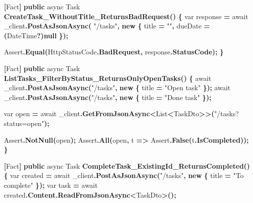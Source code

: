 \documentclass[
  italian,
  10pt,
]{book}
\newenvironment{Shaded}{\begin{snugshade}}{\end{snugshade}}
\newcommand{\DataTypeTok}[1]{\textcolor[rgb]{0.13,0.29,0.53}{#1}}
\newcommand{\FunctionTok}[1]{\textcolor[rgb]{0.13,0.29,0.53}{\textbf{#1}}}
\newcommand{\KeywordTok}[1]{\textcolor[rgb]{0.13,0.29,0.53}{\textbf{#1}}}
\newcommand{\NormalTok}[1]{#1}
\newcommand{\OperatorTok}[1]{\textcolor[rgb]{0.81,0.36,0.00}{\textbf{#1}}}
\newcommand{\StringTok}[1]{\textcolor[rgb]{0.31,0.60,0.02}{#1}}
\begin{document}
\begin{Shaded}
\begin{Highlighting}[]
    \OperatorTok{[}\NormalTok{Fact}\OperatorTok{]}
    \KeywordTok{public}\NormalTok{ async Task }\FunctionTok{CreateTask\_WithoutTitle\_ReturnsBadRequest}\OperatorTok{()}
    \OperatorTok{\{}
        \DataTypeTok{var}\NormalTok{ response }\OperatorTok{=}\NormalTok{ await \_client}\OperatorTok{.}\FunctionTok{PostAsJsonAsync}\OperatorTok{(}
            \StringTok{"/tasks"}\OperatorTok{,} \KeywordTok{new} \OperatorTok{\{}\NormalTok{ title }\OperatorTok{=} \StringTok{""}\OperatorTok{,}\NormalTok{ dueDate }\OperatorTok{=} \OperatorTok{(}\NormalTok{DateTime}\OperatorTok{?)}\KeywordTok{null} \OperatorTok{\});}

\NormalTok{        Assert}\OperatorTok{.}\FunctionTok{Equal}\OperatorTok{(}\NormalTok{HttpStatusCode}\OperatorTok{.}\FunctionTok{BadRequest}\OperatorTok{,}\NormalTok{ response}\OperatorTok{.}\FunctionTok{StatusCode}\OperatorTok{);}
    \OperatorTok{\}}

    \OperatorTok{[}\NormalTok{Fact}\OperatorTok{]}
    \KeywordTok{public}\NormalTok{ async Task }\FunctionTok{ListTasks\_FilterByStatus\_ReturnsOnlyOpenTasks}\OperatorTok{()}
    \OperatorTok{\{}
\NormalTok{        await \_client}\OperatorTok{.}\FunctionTok{PostAsJsonAsync}\OperatorTok{(}\StringTok{"/tasks"}\OperatorTok{,} \KeywordTok{new} \OperatorTok{\{}\NormalTok{ title }\OperatorTok{=} \StringTok{"Open task"} \OperatorTok{\});}
\NormalTok{        await \_client}\OperatorTok{.}\FunctionTok{PostAsJsonAsync}\OperatorTok{(}\StringTok{"/tasks"}\OperatorTok{,} \KeywordTok{new} \OperatorTok{\{}\NormalTok{ title }\OperatorTok{=} \StringTok{"Done task"} \OperatorTok{\});}

        \DataTypeTok{var}\NormalTok{ open }\OperatorTok{=}\NormalTok{ await \_client}\OperatorTok{.}\FunctionTok{GetFromJsonAsync}\OperatorTok{\textless{}}\NormalTok{List}\OperatorTok{\textless{}}\NormalTok{TaskDto}\OperatorTok{\textgreater{}\textgreater{}(}\StringTok{"/tasks?status=open"}\OperatorTok{);}

\NormalTok{        Assert}\OperatorTok{.}\FunctionTok{NotNull}\OperatorTok{(}\NormalTok{open}\OperatorTok{);}
\NormalTok{        Assert}\OperatorTok{.}\FunctionTok{All}\OperatorTok{(}\NormalTok{open}\OperatorTok{,}\NormalTok{ t }\OperatorTok{=\textgreater{}}\NormalTok{ Assert}\OperatorTok{.}\FunctionTok{False}\OperatorTok{(}\NormalTok{t}\OperatorTok{.}\FunctionTok{IsCompleted}\OperatorTok{));}
    \OperatorTok{\}}

    \OperatorTok{[}\NormalTok{Fact}\OperatorTok{]}
    \KeywordTok{public}\NormalTok{ async Task }\FunctionTok{CompleteTask\_ExistingId\_ReturnsCompleted}\OperatorTok{()}
    \OperatorTok{\{}
        \DataTypeTok{var}\NormalTok{ created }\OperatorTok{=}\NormalTok{ await \_client}\OperatorTok{.}\FunctionTok{PostAsJsonAsync}\OperatorTok{(}\StringTok{"/tasks"}\OperatorTok{,} \KeywordTok{new} \OperatorTok{\{}\NormalTok{ title }\OperatorTok{=} \StringTok{"To complete"} \OperatorTok{\});}
        \DataTypeTok{var}\NormalTok{ task }\OperatorTok{=}\NormalTok{ await created}\OperatorTok{.}\FunctionTok{Content}\OperatorTok{.}\FunctionTok{ReadFromJsonAsync}\OperatorTok{\textless{}}\NormalTok{TaskDto}\OperatorTok{\textgreater{}();}


\end{Highlighting}
\end{Shaded}
\end{document}
